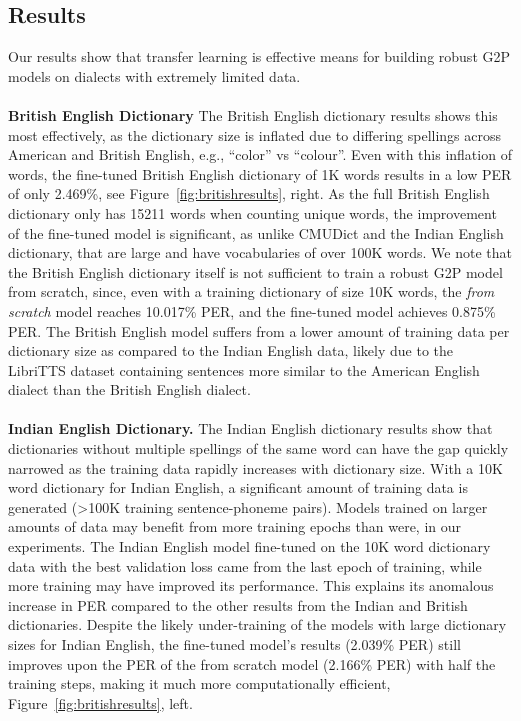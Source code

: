 \subsection{Results}
Our results show that transfer learning is effective means for building robust G2P models on dialects with extremely limited data. 
\\
\\
\textbf{British English Dictionary} The British English dictionary results shows this most effectively, as the dictionary size is inflated due to differing spellings across American and British English, e.g., ``color'' vs ``colour''. Even with this inflation of words, the fine-tuned British English dictionary of 1K words results in a low PER of only 2.469\%, see Figure~\ref{fig:britishresults}, right. As the full British English dictionary only has 15211 words when counting unique words, the improvement of the fine-tuned model is significant, as unlike CMUDict and the Indian English dictionary, that are large and have vocabularies of over 100K words. We note that the British English dictionary itself is not sufficient to train a robust G2P model from scratch, since, even with a training dictionary of size 10K words, the \emph{from scratch} model reaches 10.017\% PER, and the fine-tuned model achieves 0.875\% PER. The British English model suffers from a lower amount of training data per dictionary size as compared to the Indian English data, likely due to the LibriTTS dataset containing sentences more similar to the American English dialect than the British English dialect.
\\
\\
\textbf{Indian English Dictionary.} The Indian English dictionary results show that dictionaries without multiple spellings of the same word can have the gap quickly narrowed as the training data rapidly increases with dictionary size. With a 10K word dictionary for Indian English, a significant amount of training data is generated (\textgreater 100K training sentence-phoneme pairs). Models trained on larger amounts of data may benefit from more training epochs than were, in our experiments. The Indian English model fine-tuned on the 10K word dictionary data with the best validation loss came from the last epoch of training, while more training may have improved its performance. This explains its anomalous increase in PER compared to the other results from the Indian and British dictionaries. Despite the likely under-training of the models with large dictionary sizes for Indian English, the fine-tuned model's results (2.039\% PER) still improves upon the PER of the from scratch model (2.166\% PER) with half the training steps, making it much more computationally efficient, Figure~\ref{fig:britishresults}, left.


